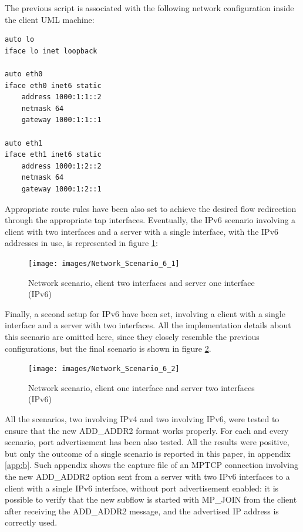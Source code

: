The previous script is associated with the following network configuration inside the client UML machine:

\begin{verbatim}
auto lo
iface lo inet loopback

auto eth0
iface eth0 inet6 static
	address 1000:1:1::2
	netmask 64
	gateway 1000:1:1::1

auto eth1
iface eth1 inet6 static
	address 1000:1:2::2
	netmask 64
	gateway 1000:1:2::1
\end{verbatim}

Appropriate route rules have been also set to achieve the desired flow redirection through the appropriate tap interfaces. Eventually, the IPv6 scenario involving a client with two interfaces and a server with a single interface, with the IPv6 addresses in use, is represented in figure \ref{fig:netip6_1}:

\begin{figure}[!htb]
\centering
\texttt{[image: images/Network\_Scenario\_6\_1]}
\caption{Network scenario, client two interfaces and server one interface (IPv6)}
\label{fig:netip6_1}
\end{figure} 

Finally, a second setup for IPv6 have been set, involving a client with a single interface and a server with two interfaces. All the implementation details about this scenario are omitted here, since they closely resemble the previous configurations, but the final scenario is shown in figure \ref{fig:netip6_2}.

\begin{figure}[!htb]
\centering
\texttt{[image: images/Network\_Scenario\_6\_2]}
\caption{Network scenario, client one interface and server two interfaces (IPv6)}
\label{fig:netip6_2}
\end{figure} 

All the scenarios, two involving IPv4 and two involving IPv6, were tested to ensure that the new ADD\_ADDR2 format works properly. For each and every scenario, port advertisement has been also tested. All the results were positive, but only the outcome of a single scenario is reported in this paper, in appendix \ref{app:b}. Such appendix shows the capture file of an MPTCP connection involving the new ADD\_ADDR2 option sent from a server with two IPv6 interfaces to a client with a single IPv6 interface, without port advertisement enabled: it is possible to verify that the new subflow is started with MP\_JOIN from the client after receiving the ADD\_ADDR2 message, and the advertised IP address is correctly used.

